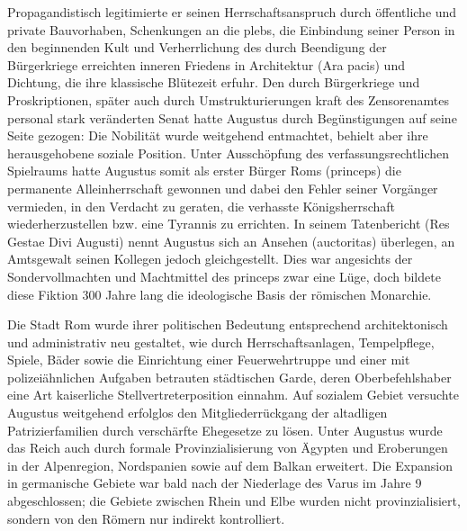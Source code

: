 Propagandistisch legitimierte er seinen Herrschaftsanspruch durch öffentliche und private Bauvorhaben, Schenkungen an die plebs, die Einbindung seiner Person in den beginnenden Kult und Verherrlichung des durch Beendigung der Bürgerkriege erreichten inneren Friedens in Architektur (Ara pacis) und Dichtung, die ihre klassische Blütezeit erfuhr. Den durch Bürgerkriege und Proskriptionen, später auch durch Umstrukturierungen kraft des Zensorenamtes personal stark veränderten Senat hatte \gls{Augustus} durch Begünstigungen auf seine Seite gezogen: Die Nobilität wurde weitgehend entmachtet, behielt aber ihre herausgehobene soziale Position. Unter Ausschöpfung des verfassungsrechtlichen Spielraums hatte \gls{Augustus} somit als erster Bürger Roms (princeps) die permanente Alleinherrschaft gewonnen und dabei den Fehler seiner Vorgänger vermieden, in den Verdacht zu geraten, die verhasste Königsherrschaft wiederherzustellen bzw. eine Tyrannis zu errichten. In seinem Tatenbericht (Res Gestae Divi Augusti) nennt \gls{Augustus} sich an Ansehen (auctoritas) überlegen, an Amtsgewalt seinen Kollegen jedoch gleichgestellt. Dies war angesichts der Sondervollmachten und Machtmittel des princeps zwar eine Lüge, doch bildete diese Fiktion 300 Jahre lang die ideologische Basis der römischen Monarchie.

Die Stadt Rom wurde ihrer politischen Bedeutung entsprechend architektonisch und administrativ neu gestaltet, wie durch Herrschaftsanlagen, Tempelpflege, Spiele, Bäder sowie die Einrichtung einer Feuerwehrtruppe und einer mit polizeiähnlichen Aufgaben betrauten städtischen Garde, deren Oberbefehlshaber eine Art kaiserliche Stellvertreterposition einnahm. Auf sozialem Gebiet versuchte \gls{Augustus} weitgehend erfolglos den Mitgliederrückgang der altadligen Patrizierfamilien durch verschärfte Ehegesetze zu lösen. Unter \gls{Augustus} wurde das Reich auch durch formale Provinzialisierung von Ägypten und Eroberungen in der Alpenregion, Nordspanien sowie auf dem Balkan erweitert. Die Expansion in germanische Gebiete war bald nach der Niederlage des Varus im Jahre 9 abgeschlossen; die Gebiete zwischen Rhein und Elbe wurden nicht provinzialisiert, sondern von den Römern nur indirekt kontrolliert.

